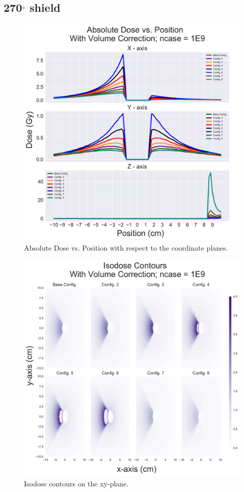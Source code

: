 \documentclass[12pt]{article}
\begin{document}
\FloatBarrier

\subsection{270$\degree$ shield}

\begin{figure}[!ht]
	\centering
	\includegraphics[scale=0.6]{dosage_comparison_270Shield}
	\caption{Absolute Dose vs. Position with respect to the coordinate planes.}
\end{figure}

\begin{figure}[!ht]
	\centering
	\includegraphics[scale=0.6]{xy_isodose_profiles_270Shield}
	\caption{Isodose contours on the xy-plane.}
\end{figure}
\end{document}
